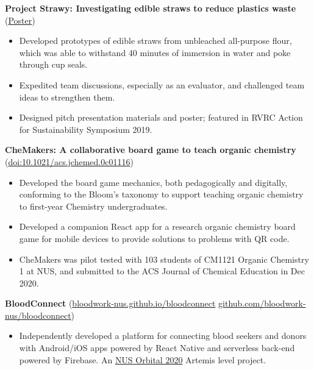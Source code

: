\documentclass[a4paper, 11pt]{article}
\newcommand{\intraspace}{\vspace{5pt}}
\begin{document}
	\textbf{Project Strawy: Investigating edible straws to reduce plastics waste} (\href{https://drive.google.com/file/d/15xKE6J7IFcU33w_PgHe4C2bpB9JK7ku8/view?usp=sharing}{Poster})
	\begin{itemize}[leftmargin=*, noitemsep, topsep=0pt]
		\item Developed prototypes of edible straws from unbleached all-purpose flour, which was able to withstand 40 minutes of immersion in water and poke through cup seals.
		\item Expedited team discussions, especially as an evaluator, and challenged team ideas to strengthen them.
		\item Designed pitch presentation materials and poster; featured in RVRC Action for Sustainability Symposium 2019.
	\end{itemize}

	\intraspace
	
	\textbf{CheMakers: A collaborative board game to teach organic chemistry} (\href{https://pubs.acs.org/doi/abs/10.1021/acs.jchemed.0c01116}{doi:10.1021/acs.jchemed.0c01116})
	\begin{itemize}[leftmargin=*, noitemsep, topsep=0pt]
		\item Developed the board game mechanics, both pedagogically and digitally, conforming to the Bloom's taxonomy to support teaching organic chemistry to first-year Chemistry undergraduates.
		\item Developed a companion React app for a research organic chemistry board game for mobile devices to provide solutions to problems with QR code.
		\item CheMakers was pilot tested with 103 students of CM1121 Organic Chemistry 1 at NUS, and submitted to the ACS Journal of Chemical Education in Dec 2020.
	\end{itemize}
	
	\intraspace
	
	\textbf{BloodConnect} (\href{https://bloodwork-nus.github.io/bloodconnect/}{bloodwork-nus.github.io/bloodconnect} \textbar\space \href{https://github.com/bloodwork-nus/bloodconnect}{github.com/bloodwork-nus/bloodconnect})
	\begin{itemize}[leftmargin=*, noitemsep, topsep=0pt]
		\item Independently developed a platform for connecting blood seekers and donors with Android/iOS apps powered by React Native and serverless back-end powered by Firebase. An \href{https://orbital.comp.nus.edu.sg/}{NUS Orbital 2020} Artemis level project.
	\end{itemize}
	
\end{document}
